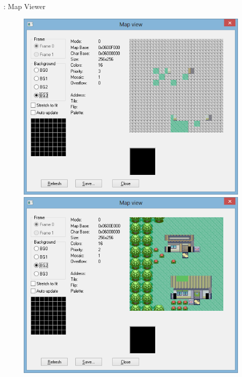 \documentclass{beamer}
\begin{document}
\begin{darkframes}
\begin{frame}{\subsecname: Map Viewer}
    \begin{figure}
        \centering
        \includegraphics[width=1\textwidth,height=0.4\textheight,keepaspectratio]{mapview}
        \includegraphics[width=1\textwidth,height=0.4\textheight,keepaspectratio]{mapview2}
    \end{figure}
    \vspace{-2.5em}
    \begin{figure}
        \centering

\end{figure}
\end{frame}
\end{darkframes}
\end{document}
